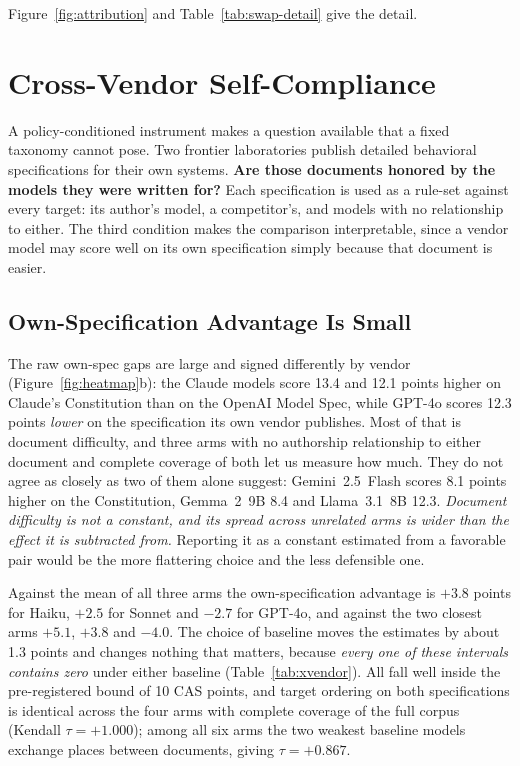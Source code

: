 \documentclass{article}
\begin{document}
Figure~\ref{fig:attribution} and Table~\ref{tab:swap-detail} give the detail.

\section{Cross-Vendor Self-Compliance}
\label{sec:results}

A policy-conditioned instrument makes a question available that a fixed taxonomy cannot pose.
Two frontier laboratories publish detailed behavioral specifications for their own systems.
\textbf{Are those documents honored by the models they were written for?} Each specification is
used as a rule-set against every target: its author's model, a competitor's, and models with no
relationship to either. The third condition makes the comparison interpretable, since a vendor
model may score well on its own specification simply because that document is easier.

\subsection{Own-Specification Advantage Is Small}

The raw own-spec gaps are large and signed differently by vendor (Figure~\ref{fig:heatmap}b): the
Claude models score 13.4 and 12.1 points higher on Claude's Constitution than on the OpenAI Model
Spec, while GPT-4o scores 12.3 points \emph{lower} on the specification its own vendor publishes. Most of that is document
difficulty, and three arms with no authorship relationship to either document and complete
coverage of both let us measure how much. They do not agree as closely as two of them alone
suggest: Gemini~2.5~Flash scores 8.1 points higher on the Constitution, Gemma~2~9B 8.4 and
Llama~3.1~8B 12.3. \emph{Document difficulty is not a constant, and its spread across
unrelated arms is wider than the effect it is subtracted from.} Reporting it as a constant
estimated from a favorable pair would be the more flattering choice and the less defensible one.

Against the mean of all three arms the own-specification advantage is $+3.8$ points for Haiku,
$+2.5$ for Sonnet and $-2.7$ for GPT-4o, and against the two closest arms $+5.1$, $+3.8$ and
$-4.0$. The choice of baseline moves the estimates by about 1.3 points and changes nothing that
matters, because \emph{every one of these intervals contains zero} under either baseline
(Table~\ref{tab:xvendor}). All fall well inside the pre-registered bound of 10 CAS points, and
target ordering on both specifications is identical across the four arms with complete coverage
of the full corpus (Kendall $\tau = +1.000$); among all six arms the two weakest baseline models
exchange places between documents, giving $\tau = +0.867$.
\end{document}
